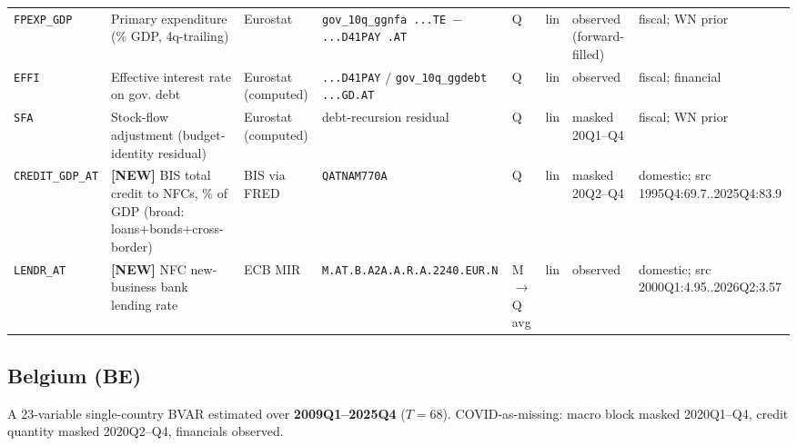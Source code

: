 \begin{longtable}{@{}p{}p{}p{}p{}p{}p{}p{}p{}@{}}
\texttt{FPEXP\_GDP} & Primary expenditure (\% GDP, 4q-trailing) & Eurostat & \texttt{gov\_10q\_ggnfa ...\allowbreak TE $-$ ...\allowbreak D41PAY .\allowbreak AT} & Q & lin & observed (forward-filled) & fiscal; WN prior \\
\texttt{EFFI}       & Effective interest rate on gov. debt & Eurostat (computed) & \texttt{...D41PAY} $/$ \texttt{gov\_10q\_ggdebt ...\allowbreak GD.\allowbreak AT} & Q & lin & observed & fiscal; financial \\
\texttt{SFA}        & Stock-flow adjustment (budget-identity residual) & Eurostat (computed) & debt-recursion residual & Q & lin & masked 20Q1--Q4 & fiscal; WN prior \\
\texttt{CREDIT\_GDP\_AT} & \textbf{[NEW]} BIS total credit to NFCs, \% of GDP (broad: loans+bonds+cross-border) & BIS via FRED & \texttt{QATNAM770A} & Q & lin & masked 20Q2--Q4 & domestic; src 1995Q4:69.7..\allowbreak 2025Q4:83.9 \\
\texttt{LENDR\_AT}  & \textbf{[NEW]} NFC new-business bank lending rate & ECB MIR & \texttt{M.\allowbreak AT.\allowbreak B.\allowbreak A2A.\allowbreak A.\allowbreak R.\allowbreak A.2240.\allowbreak EUR.\allowbreak N} & M$\to$Q avg & lin & observed & domestic; src 2000Q1:4.95..\allowbreak 2026Q2:3.57 \\
\end{longtable}

\subsection{Belgium (BE)}
\label{sec:data:BE}

A 23-variable single-country BVAR estimated over \textbf{2009Q1--2025Q4}
($T=68$). COVID-as-missing: macro block masked 2020Q1--Q4, credit quantity
masked 2020Q2--Q4, financials observed.

